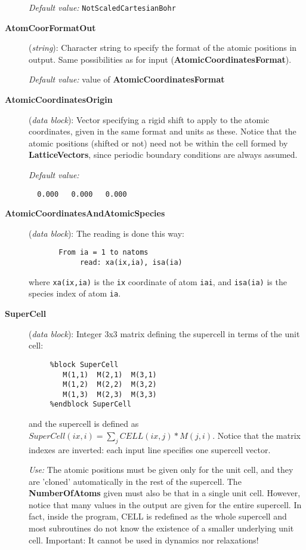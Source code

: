 \begin{description}
{\it Default value:} {\tt NotScaledCartesianBohr}


\item[{\bf AtomCoorFormatOut}] ({\it string}):
Character string to specify the format of the atomic positions in output.
Same possibilities as for input ({\bf AtomicCoordinatesFormat}).

{\it Default value:} value of {\bf AtomicCoordinatesFormat}


\item[{\bf AtomicCoordinatesOrigin}] ({\it data block}): 
Vector specifying a rigid shift to apply to the atomic coordinates,
given in the same format and units as these. Notice that the atomic
positions (shifted or not) need not be within the cell formed by
{\bf LatticeVectors}, since periodic boundary conditions are always
assumed.

{\it Default value:} 
\begin{verbatim}
  0.000   0.000   0.000
\end{verbatim}


\item[{\bf AtomicCoordinatesAndAtomicSpecies}] ({\it data block}): 
The reading is done this way:
\begin{verbatim}
       From ia = 1 to natoms
            read: xa(ix,ia), isa(ia)
\end{verbatim}
where {\tt xa(ix,ia)} is the {\tt ix} coordinate of atom 
{\tt iai}, and {\tt isa(ia)} is the species index of atom {\tt ia}.

\item[{\bf SuperCell}] ({\it data block}): 
Integer 3x3 matrix defining the supercell in terms of the unit cell: 

\begin{verbatim}
     %block SuperCell
        M(1,1)  M(2,1)  M(3,1) 
        M(1,2)  M(2,2)  M(3,2) 
        M(1,3)  M(2,3)  M(3,3) 
     %endblock SuperCell
\end{verbatim}

and the supercell is defined as
$SuperCell(ix,i) = \sum_j CELL(ix,j)*M(j,i)$.
Notice that the matrix indexes are inverted: each input line 
specifies one supercell vector.

{\it Use:} The atomic positions must be given only for the unit cell,
and they are 'cloned' automatically in the rest of the supercell.
The {\bf NumberOfAtoms} given must also be that in a single unit cell.
However, notice that many values in the output are given for the
entire supercell. In fact, inside the program, CELL is redefined
as the whole supercell and most subroutines do not know the existence
of a smaller underlying unit cell.
Important: It cannot be used in dynamics nor relaxations!


\end{description}
